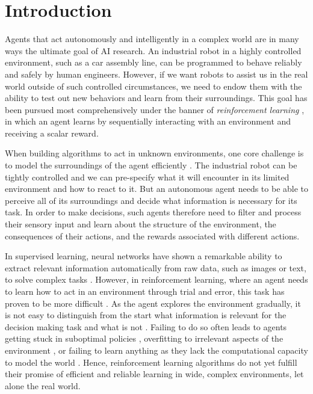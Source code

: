 \chapter{Introduction}

Agents that act autonomously and intelligently in a complex world are in many ways the ultimate goal of AI research.
An industrial robot in a highly controlled environment, such as a car assembly line, can be programmed to behave reliably and safely by human engineers.
However, if we want robots to assist us in the real world outside of such controlled circumstances, we need to endow them with the ability to test out new behaviors and learn from their surroundings.
This goal has been pursued most comprehensively under the banner of \emph{reinforcement learning} \parencite{suttonbook}, in which an agent learns by sequentially interacting with an environment and receiving a scalar reward.

When building algorithms to act in unknown environments, one core challenge is to model the surroundings of the agent efficiently \parencite{}.
The industrial robot can be tightly controlled and we can pre-specify what it will encounter in its limited environment and how to react to it.
But an autonomous agent needs to be able to perceive all of its surroundings and decide what information is necessary for its task.
In order to make decisions, such agents therefore need to filter and process their sensory input and learn about the structure of the environment, the consequences of their actions, and the rewards associated with different actions.

In supervised learning, neural networks have shown a remarkable ability to extract relevant information automatically from raw data, such as images or text, to solve complex tasks \parencite{goodfellow2016deep}.
However, in reinforcement learning, where an agent needs to learn how to act in an environment through trial and error, this task has proven to be more difficult \parencite{jaderberg2017reinforcement,igl2021transient,lyle2021effect,kumar2021implicit,nikishin2022primacy,hussing2024dissecting}.
As the agent explores the environment gradually, it is not easy to distinguish from the start what information is relevant for the decision making task and what is not \parencite{igl2021transient,voelcker2022value}.
Failing to do so often leads to agents getting stuck in suboptimal policies \parencite{kumar2021implicit}, overfitting to irrelevant aspects of the environment \parencite{song2020observational}, or failing to learn anything as they lack the computational capacity to model the world \parencite{kumar2021implicit,nikishin2022primacy}.
Hence, reinforcement learning algorithms do not yet fulfill their promise of efficient and reliable learning in wide, complex environments, let alone the real world.


